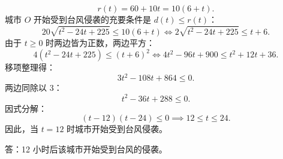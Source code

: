 \begin{answer}
\nopagebreak[4]
\[r(t) = 60 + 10t = 10(6 + t).\]
城市 $O$ 开始受到台风侵袭的充要条件是 $d(t) \le r(t)$：
\nopagebreak[4]
\[20\sqrt{t^2 - 24t + 225} \le 10(6 + t) \iff 2\sqrt{t^2 - 24t + 225} \le t + 6.\]
由于 $t \ge 0$ 时两边皆为正数，两边平方：
\nopagebreak[4]
\[4(t^2 - 24t + 225) \le (t + 6)^2 \iff 4t^2 - 96t + 900 \le t^2 + 12t + 36.\]
移项整理得：
\nopagebreak[4]
\[3t^2 - 108t + 864 \le 0.\]
两边同除以 3：
\nopagebreak[4]
\[t^2 - 36t + 288 \le 0.\]
因式分解：
\nopagebreak[4]
\[(t - 12)(t - 24) \le 0 \implies 12 \le t \le 24.\]
因此，当 $t = 12$ 时城市开始受到台风侵袭。

答：12 小时后该城市开始受到台风的侵袭。


\end{answer}
